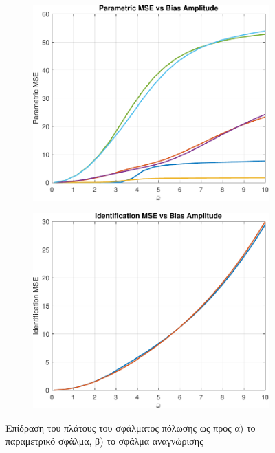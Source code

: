 \documentclass[a4paper,12pt]{article}
\begin{document}
\begin{figure}[htbp]
  \centering
  \begin{subfigure}[b]{0.45\textwidth}
    \centering
    \includegraphics[width=\textwidth]{plot/task1_parametric_mse_vs_bias_amplitude.pdf}
    \caption{}
    \label{fig:task1_parametric_mse_vs_bias_amplitude}
  \end{subfigure}
  \hfill
  \begin{subfigure}[b]{0.45\textwidth}
    \centering
    \includegraphics[width=\textwidth]{plot/task1_identification_mse_vs_bias_amplitude.pdf}
    \caption{}
    \label{fig:task1_identification_mse_vs_bias_amplitude}
  \end{subfigure}
  \caption{Επίδραση του πλάτους του σφάλματος πόλωσης ως προς α) το παραμετρικό σφάλμα, 
  β) το σφάλμα αναγνώρισης}
\end{figure}
\end{document}
